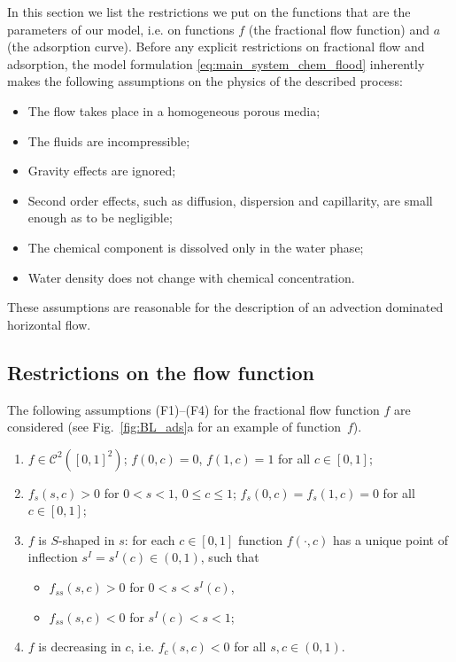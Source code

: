 \documentclass[12pt]{article}
\renewcommand{\leq}{\leqslant}
\theoremstyle{definition}
\begin{document}
In this section we list the restrictions we put on the functions that are the parameters of our model, i.e. on functions $f$ (the fractional flow function) and $a$ (the adsorption curve). Before any explicit restrictions on fractional flow and adsorption, the model formulation \eqref{eq:main_system_chem_flood} inherently makes the following assumptions on the physics of the described process:
\begin{itemize}
    \item The flow takes place in a homogeneous porous media;
    \item The fluids are incompressible;
    \item Gravity effects are ignored;
    \item Second order effects, such as diffusion, dispersion and capillarity,  are small enough as to be negligible;
    \item The chemical component is dissolved only in the water phase;
    \item Water density does not change with chemical concentration.
\end{itemize}
These assumptions are reasonable for the description of an advection dominated horizontal flow. 


\subsection{Restrictions on the flow function}
The following assumptions (F1)--(F4) for the fractional flow function $f$ are considered (see Fig.~\ref{fig:BL_ads}a for an example of function~$f$). 
\begin{enumerate}
    \item[(F1)] $f\in \mathcal C^2([0,1]^2)$; $f(0, c)=0$, $f(1, c)= 1$ for all $c\in[0,1]$;
    \item[(F2)] $f_s(s, c)>0$ for $0<s<1$, $0 \leq c \leq 1$;  $f_s(0,c)=f_s(1,c)=0$  for all $c\in[0,1]$;
    \item[(F3)] $f$ is $S$-shaped in $s$: for each $c \in [0,1]$ function $f(\cdot,c)$ has a unique point of inflection $s^I =  s^I(c) \in (0, 1)$, such that 
    \begin{itemize}
        \item[-] $f_{ss}(s, c)>0$ for $0<s<s^I(c)$,
        \item[-] $f_{ss}(s, c)<0$ for $s^I(c)<s<1$; 
    \end{itemize}
    
    \item[(F4)] $f$ is decreasing in $c$, i.e. $f_c(s,c)<0$ for all $s, c \in (0,1)$.
    


\end{enumerate}
\end{document}
